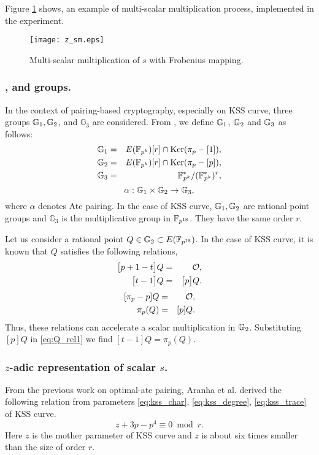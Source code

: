 Figure \ref{fig:z_sml} shows, an example of multi-scalar multiplication process, implemented in the experiment.
\begin{figure}[!ht]
\centering
\texttt{[image: z\_sm.eps]}
\caption{Multi-scalar multiplication of $s$ with Frobenius mapping.}
\label{fig:z_sml}
\end{figure}

\subsubsection{,  and  groups.} In the context of pairing-based cryptography, especially on KSS curve, three groups ${\mathbb{G}}_{1}, {\mathbb{G}}_{2}$, and $\mathbb{G}_3$ are considered. From \cite{mori}, we define ${\mathbb{G}}_{1}$, ${\mathbb{G}}_{2}$ and ${\mathbb{G}}_{3}$ as follows:
\begin{eqnarray}\label{eq:g1}
{\mathbb{G}}_{1} & = &  E({\mathbb{F}}_{p^{k}}) [r] \cap \text{Ker}(\pi_p - [1]), \nonumber \\
{\mathbb{G}}_{2} & = &  E({\mathbb{F}}_{p^{k}}) [r] \cap \text{Ker}(\pi_p - [p]), \nonumber \\
{\mathbb{G}}_{3} & = & {{\mathbb{F}}^{\ast}}_{\!\!\!p^{k}}/({{\mathbb{F}}^{\ast}}_{\!\!\!p^{k}})^r, \nonumber
\end{eqnarray}
\begin{equation}
\alpha : {\mathbb{G}}_{1} \times {\mathbb{G}}_{2} \rightarrow {\mathbb{G}}_{3},
\end{equation}
where $\alpha$ denotes Ate pairing. In the case of KSS curve, ${\mathbb{G}}_{1}, {\mathbb{G}}_{2}$ are rational point groups and $\mathbb{G}_3$ is the multiplicative group in $\mathbb{F}_{p^{18}}$. They have the same order $r$. 

Let us consider a rational point $Q\in {\mathbb{G}}_{2} \subset E({\mathbb{F}}_{p^{18}})$.
In the case of KSS curve, it is known that $Q$ satisfies the following relations,
\begin{eqnarray}\label{eq:Q_rel1}
\big[p+1-t\big]Q & = & \cal O, \nonumber \\
\big[t-1\big]Q  & = & \big[p\big]Q.
\end{eqnarray}
\begin{eqnarray}\label{eq:Q_rel2}
[\pi_p -p]Q & = &\cal O, \nonumber \\
\pi_p(Q) & = & [p]Q.
\end{eqnarray}
Thus, these relations can accelerate a scalar multiplication in ${\mathbb{G}}_{2}$.
Substituting $[p]Q$ in \eqref{eq:Q_rel1} we find $[t-1]Q = \pi_p(Q)$.

\subsubsection{$z$-adic representation of scalar $s$.}
From the previous work on optimal-ate pairing, Aranha et al. \cite{aranha} derived the following relation from parameters \eqref{eq:kss_char}, \eqref{eq:kss_degree}, \eqref{eq:kss_trace} of KSS curve.
\begin{equation}\label{eq:aranha_relation}
z+3p-p^4 \equiv 0 \bmod {r}.
\end{equation}
Here $z$ is the mother parameter of KSS curve and $z$ is about six times smaller than the size of order $r$. 

